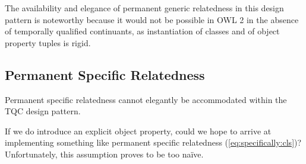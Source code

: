The availability and elegance of permanent generic relatedness in this design pattern is noteworthy because
it would not be possible in OWL 2 in the absence of temporally qualified
continuants, as instantiation of classes and of object property
tuples is rigid. %



\subsection*{Permanent Specific Relatedness}
Permanent specific relatedness cannot elegantly be accommodated within the TQC design pattern. 

If we do introduce an explicit object property, could we hope to arrive at
implementing something like permanent specific relatedness
(\ref{eq:specifically:cls})? Unfortunately, this assumption proves to be too na\"ive.

